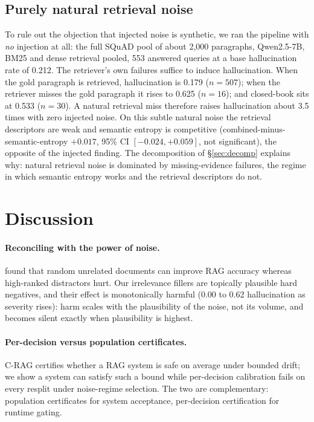 \documentclass[sn-basic]{sn-jnl}
\theoremstyle{thmstyleone}
\theoremstyle{thmstyletwo}
\begin{document}
\subsection{Purely natural retrieval noise}\label{sec:natnoise}
To rule out the objection that injected noise is synthetic, we ran the
pipeline with \emph{no} injection at all: the full SQuAD pool of about
2{,}000 paragraphs, Qwen2.5-7B, BM25 and dense retrieval pooled, 553
answered queries at a base hallucination rate of 0.212. The retriever's
own failures suffice to induce hallucination. When the gold paragraph is
retrieved, hallucination is 0.179 ($n = 507$); when the retriever misses
the gold paragraph it rises to 0.625 ($n = 16$); and closed-book sits at
0.533 ($n = 30$). A natural retrieval miss therefore raises hallucination
about 3.5 times with zero injected noise. On
this subtle natural noise the retrieval descriptors are weak and semantic
entropy is competitive (combined-minus-semantic-entropy $+0.017$, 95\% CI
$[-0.024, +0.059]$, not significant), the opposite of the injected
finding. The decomposition of \S\ref{sec:decomp} explains why: natural
retrieval noise is dominated by missing-evidence failures, the regime in
which semantic entropy works and the retrieval descriptors do not.



\section{Discussion}\label{sec:discussion}

\paragraph{Reconciling with the power of noise.}
\citet{cuconasu2024power} found that random unrelated documents can improve RAG
accuracy whereas high-ranked distractors hurt. Our irrelevance fillers are
topically plausible hard negatives, and their effect is monotonically harmful
(0.00 to 0.62 hallucination as severity rises): harm scales with the
plausibility of the noise, not its volume, and becomes silent exactly when
plausibility is highest.

\paragraph{Per-decision versus population certificates.}
C-RAG \citep{kang2024crag} certifies whether a RAG system is safe on average
under bounded drift; we show a system can satisfy such a bound while
per-decision calibration fails on every resplit under noise-regime selection.
The two are complementary: population certificates for system acceptance,
per-decision certification for runtime gating.
\end{document}
